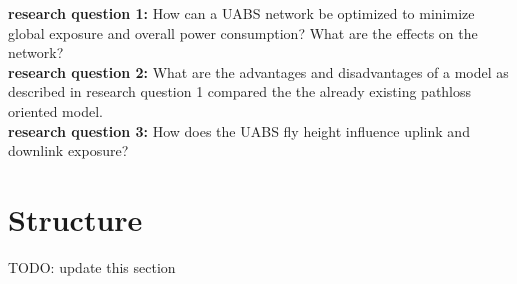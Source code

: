 \textbf{research question 1:} How can a \gls{UABS} network be optimized to minimize global exposure and overall power consumption? What are the effects on the network?\\

\textbf{research question 2:} What are the advantages and disadvantages of a model as described in research question 1 compared the the already existing pathloss oriented model.\\

\textbf{research question 3:} How does the \gls{UABS} fly height influence uplink and downlink exposure?



\section{Structure}
\label{sec:structure}

TODO: update this section



